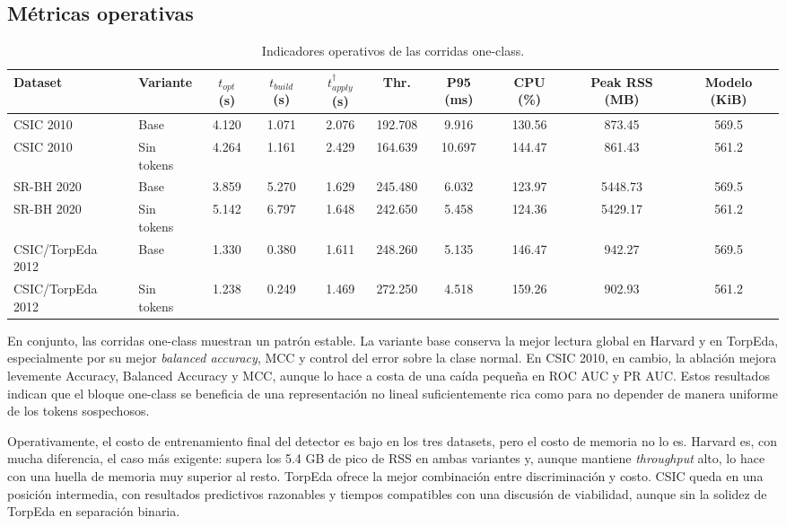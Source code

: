 \documentclass[12pt,oneside]{report}
\begin{document}
\subsection{Métricas operativas}
\begin{table}[H]
\centering
\caption{Indicadores operativos de las corridas one-class.}
\label{tab:res-one-op}
\scriptsize
\renewcommand{\arraystretch}{1.12}
\begin{adjustbox}{max width=\textwidth}
\begin{tabular}{llcccccccc}
\toprule
\textbf{Dataset} & \textbf{Variante} & $t_{opt}$ (s) & $t_{build}$ (s) & $t_{apply}^{\dagger}$ (s) & \textbf{Thr.} & \textbf{P95} (ms) & \textbf{CPU} (\%) & \textbf{Peak RSS} (MB) & \textbf{Modelo} (KiB) \\
\midrule
CSIC 2010 & Base & 4.120 & 1.071 & 2.076 & 192.708 & 9.916 & 130.56 & 873.45 & 569.5 \\CSIC 2010 & Sin tokens & 4.264 & 1.161 & 2.429 & 164.639 & 10.697 & 144.47 & 861.43 & 561.2 \\SR-BH 2020 & Base & 3.859 & 5.270 & 1.629 & 245.480 & 6.032 & 123.97 & 5448.73 & 569.5 \\SR-BH 2020 & Sin tokens & 5.142 & 6.797 & 1.648 & 242.650 & 5.458 & 124.36 & 5429.17 & 561.2 \\CSIC/TorpEda 2012 & Base & 1.330 & 0.380 & 1.611 & 248.260 & 5.135 & 146.47 & 942.27 & 569.5 \\CSIC/TorpEda 2012 & Sin tokens & 1.238 & 0.249 & 1.469 & 272.250 & 4.518 & 159.26 & 902.93 & 561.2 \\\bottomrule
\end{tabular}
\end{adjustbox}
\end{table}

En conjunto, las corridas one-class muestran un patrón estable. La variante base conserva la mejor lectura global en Harvard y en TorpEda, especialmente por su mejor \textit{balanced accuracy}, MCC y control del error sobre la clase normal. En CSIC 2010, en cambio, la ablación mejora levemente Accuracy, Balanced Accuracy y MCC, aunque lo hace a costa de una caída pequeña en ROC AUC y PR AUC. Estos resultados indican que el bloque one-class se beneficia de una representación no lineal suficientemente rica como para no depender de manera uniforme de los tokens sospechosos.\

Operativamente, el costo de entrenamiento final del detector es bajo en los tres datasets, pero el costo de memoria no lo es. Harvard es, con mucha diferencia, el caso más exigente: supera los 5.4 GB de pico de RSS en ambas variantes y, aunque mantiene \textit{throughput} alto, lo hace con una huella de memoria muy superior al resto. TorpEda ofrece la mejor combinación entre discriminación y costo. CSIC queda en una posición intermedia, con resultados predictivos razonables y tiempos compatibles con una discusión de viabilidad, aunque sin la solidez de TorpEda en separación binaria.
\end{document}
